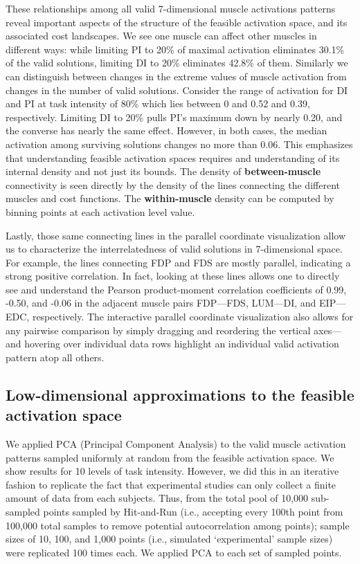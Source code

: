 \documentclass[9pt,twocolumn,twoside,lineno]{pnas-new}
\begin{document}
These relationships among all valid 7-dimensional muscle activations patterns reveal important aspects of the structure of the feasible activation space, and its associated cost landscapes. We see one muscle can affect other muscles in different ways: while limiting PI to 20\% of maximal activation eliminates 30.1\% of the valid solutions, limiting DI to 20\% eliminates 42.8\% of them. Similarly we can distinguish between changes in the extreme values of muscle activation from changes in the number of valid solutions. Consider the range of activation for DI and PI at task intensity of 80\% which lies between 0 and 0.52 and 0.39, respectively. Limiting DI to 20\% pulls PI’s maximum down by nearly 0.20, and the converse has nearly the same effect. However, in both cases, the median activation among surviving solutions changes no more than 0.06. This emphasizes that understanding feasible activation spaces requires and understanding of its internal density and not just its bounds. The density of \textbf{between-muscle} connectivity is seen directly by the density of the lines connecting the different muscles and cost functions. The \textbf{within-muscle} density can be computed by binning points at each activation level value.

Lastly, those same connecting lines in the parallel coordinate visualization allow us to characterize the interrelatedness of valid solutions in 7-dimensional space. For example, the lines connecting FDP and FDS are mostly parallel, indicating a strong positive correlation. In fact, looking at these lines allows one to directly see and understand the Pearson product-moment correlation coefficients of 0.99, -0.50, and -0.06 in the adjacent muscle pairs FDP—FDS, LUM—DI, and EIP—EDC, respectively. The interactive parallel coordinate visualization also allows for any pairwise comparison by simply dragging and reordering the vertical axes---and hovering over individual data rows highlight an individual valid activation pattern atop all others.


\subsection*{Low-dimensional approximations to the feasible activation space}

We applied PCA (Principal Component Analysis) to the valid muscle activation patterns sampled uniformly at random from the feasible activation space. We show results for 10 levels of task intensity. However, we did this in an iterative fashion to replicate the fact that experimental studies can only collect a finite amount of data from each subjects. Thus, from the total pool of 10,000 sub-sampled points sampled by Hit-and-Run (i.e., accepting every 100th point from 100,000 total samples to remove potential autocorrelation among points); sample sizes of 10, 100, and 1,000 points (i.e., simulated `experimental' sample sizes) were replicated 100 times each. We applied PCA to each set of sampled points.
\end{document}
